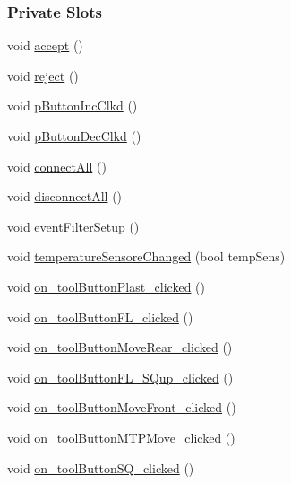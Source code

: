 \subsubsection*{Private Slots}
\begin{DoxyCompactItemize}
\item 
void \mbox{\hyperlink{classSettingDialog_ac5caf772c1ad7d7607a164ad7f6fe647}{accept}} ()
\item 
void \mbox{\hyperlink{classSettingDialog_aa2d0391c28612987805722038013f5a9}{reject}} ()
\item 
void \mbox{\hyperlink{classSettingDialog_a586eff422c5c347ee5ff3ffe71b5ba97}{p\+Button\+Inc\+Clkd}} ()
\item 
void \mbox{\hyperlink{classSettingDialog_a87b4aca2d528b1b8e943983efc9d9506}{p\+Button\+Dec\+Clkd}} ()
\item 
void \mbox{\hyperlink{classSettingDialog_acd1bbe0b354633f39e4f0a15468098ad}{connect\+All}} ()
\item 
void \mbox{\hyperlink{classSettingDialog_a5d520fb11c481f648ed061cd700916fa}{disconnect\+All}} ()
\item 
void \mbox{\hyperlink{classSettingDialog_a01d7341608bd80021abd1a5892fdb131}{event\+Filter\+Setup}} ()
\item 
void \mbox{\hyperlink{classSettingDialog_a14896cba93080b0784380651579d809c}{temperature\+Sensore\+Changed}} (bool temp\+Sens)
\item 
void \mbox{\hyperlink{classSettingDialog_a57173bd31c0554d31571332ceb175b3d}{on\+\_\+tool\+Button\+Plast\+\_\+clicked}} ()
\item 
void \mbox{\hyperlink{classSettingDialog_a28734c990957727acebddabbe01fa442}{on\+\_\+tool\+Button\+F\+L\+\_\+clicked}} ()
\item 
void \mbox{\hyperlink{classSettingDialog_a2622da82b9284689d035a96c2c3642f5}{on\+\_\+tool\+Button\+Move\+Rear\+\_\+clicked}} ()
\item 
void \mbox{\hyperlink{classSettingDialog_adf5bed0777bbaa36f25b9280528cf342}{on\+\_\+tool\+Button\+F\+L\+\_\+\+S\+Qup\+\_\+clicked}} ()
\item 
void \mbox{\hyperlink{classSettingDialog_a40bed1f6bde134fabcd9b39e4498cffb}{on\+\_\+tool\+Button\+Move\+Front\+\_\+clicked}} ()
\item 
void \mbox{\hyperlink{classSettingDialog_a44def5923853f2e47dc2ad8247a62227}{on\+\_\+tool\+Button\+M\+T\+P\+Move\+\_\+clicked}} ()
\item 
void \mbox{\hyperlink{classSettingDialog_a4c777f59dac2be7467f61d171b937a9f}{on\+\_\+tool\+Button\+S\+Q\+\_\+clicked}} ()

\end{DoxyCompactItemize}
